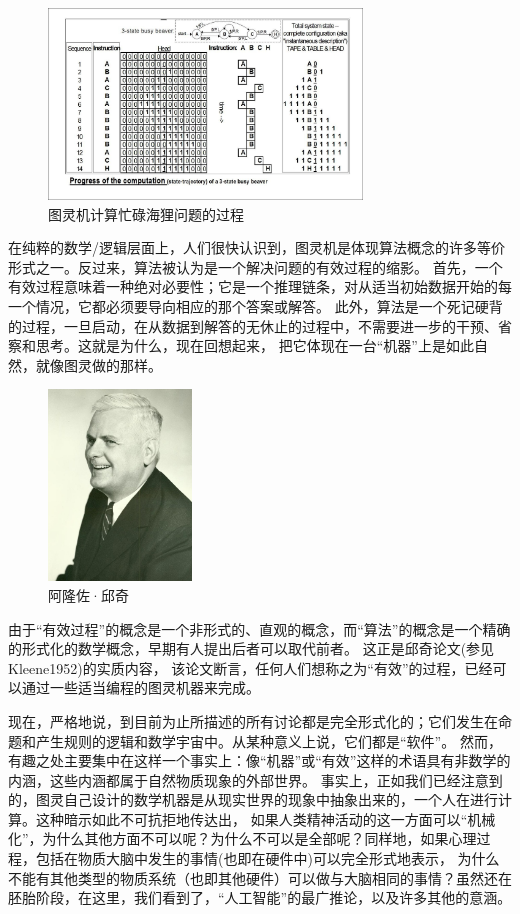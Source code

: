 \documentclass[a4paper,12pt]{article}
\begin{document}
\begin{figure}[ht]
\centering
\includegraphics[height=2.0in]{images/turing_machine.jpg}
\caption{图灵机计算忙碌海狸问题的过程}
\end{figure}

在纯粹的数学/逻辑层面上，人们很快认识到，图灵机是体现算法概念的许多等价形式之一。反过来，算法被认为是一个解决问题的有效过程的缩影。
首先，一个有效过程意味着一种绝对必要性；它是一个推理链条，对从适当初始数据开始的每一个情况，它都必须要导向相应的那个答案或解答。
此外，算法是一个死记硬背的过程，一旦启动，在从数据到解答的无休止的过程中，不需要进一步的干预、省察和思考。这就是为什么，现在回想起来，
把它体现在一台“机器”上是如此自然，就像图灵做的那样。

\begin{figure}
  \begin{center}
    \includegraphics[height=2.0in]{images/alonzo_church.jpg}
  \end{center}
  \caption{阿隆佐·邱奇}
\end{figure}

由于“有效过程”的概念是一个非形式的、直观的概念，而“算法”的概念是一个精确的形式化的数学概念，早期有人提出后者可以取代前者。
这正是邱奇论文(参见 Kleene1952)的实质内容， 该论文断言，任何人们想称之为“有效”的过程，已经可以通过一些适当编程的图灵机器来完成。

现在，严格地说，到目前为止所描述的所有讨论都是完全形式化的；它们发生在命题和产生规则的逻辑和数学宇宙中。从某种意义上说，它们都是“软件”。
然而，有趣之处主要集中在这样一个事实上：像“机器”或“有效”这样的术语具有非数学的内涵，这些内涵都属于自然物质现象的外部世界。
事实上，正如我们已经注意到的，图灵自己设计的数学机器是从现实世界的现象中抽象出来的，一个人在进行计算。这种暗示如此不可抗拒地传达出，
如果人类精神活动的这一方面可以“机械化”，为什么其他方面不可以呢？为什么不可以是全部呢？同样地，如果心理过程，包括在物质大脑中发生的事情(也即在硬件中)可以完全形式地表示，
为什么不能有其他类型的物质系统（也即其他硬件）可以做与大脑相同的事情？虽然还在胚胎阶段，在这里，我们看到了，“人工智能”的最广推论，以及许多其他的意涵。
\end{document}
